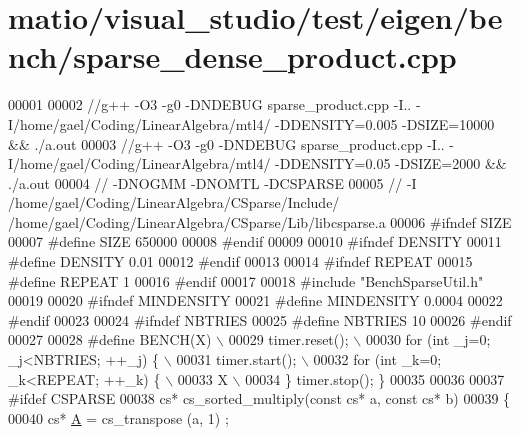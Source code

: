\hypertarget{matio_2visual__studio_2test_2eigen_2bench_2sparse__dense__product_8cpp_source}{}\section{matio/visual\+\_\+studio/test/eigen/bench/sparse\+\_\+dense\+\_\+product.cpp}
\label{matio_2visual__studio_2test_2eigen_2bench_2sparse__dense__product_8cpp_source}

\begin{DoxyCode}
00001 
00002 \textcolor{comment}{//g++ -O3 -g0 -DNDEBUG  sparse\_product.cpp -I.. -I/home/gael/Coding/LinearAlgebra/mtl4/ -DDENSITY=0.005
       -DSIZE=10000 && ./a.out}
00003 \textcolor{comment}{//g++ -O3 -g0 -DNDEBUG  sparse\_product.cpp -I.. -I/home/gael/Coding/LinearAlgebra/mtl4/ -DDENSITY=0.05
       -DSIZE=2000 && ./a.out}
00004 \textcolor{comment}{// -DNOGMM -DNOMTL -DCSPARSE}
00005 \textcolor{comment}{// -I /home/gael/Coding/LinearAlgebra/CSparse/Include/
       /home/gael/Coding/LinearAlgebra/CSparse/Lib/libcsparse.a}
00006 \textcolor{preprocessor}{#ifndef SIZE}
00007 \textcolor{preprocessor}{#define SIZE 650000}
00008 \textcolor{preprocessor}{#endif}
00009 
00010 \textcolor{preprocessor}{#ifndef DENSITY}
00011 \textcolor{preprocessor}{#define DENSITY 0.01}
00012 \textcolor{preprocessor}{#endif}
00013 
00014 \textcolor{preprocessor}{#ifndef REPEAT}
00015 \textcolor{preprocessor}{#define REPEAT 1}
00016 \textcolor{preprocessor}{#endif}
00017 
00018 \textcolor{preprocessor}{#include "BenchSparseUtil.h"}
00019 
00020 \textcolor{preprocessor}{#ifndef MINDENSITY}
00021 \textcolor{preprocessor}{#define MINDENSITY 0.0004}
00022 \textcolor{preprocessor}{#endif}
00023 
00024 \textcolor{preprocessor}{#ifndef NBTRIES}
00025 \textcolor{preprocessor}{#define NBTRIES 10}
00026 \textcolor{preprocessor}{#endif}
00027 
00028 \textcolor{preprocessor}{#define BENCH(X) \(\backslash\)}
00029 \textcolor{preprocessor}{  timer.reset(); \(\backslash\)}
00030 \textcolor{preprocessor}{  for (int \_j=0; \_j<NBTRIES; ++\_j) \{ \(\backslash\)}
00031 \textcolor{preprocessor}{    timer.start(); \(\backslash\)}
00032 \textcolor{preprocessor}{    for (int \_k=0; \_k<REPEAT; ++\_k) \{ \(\backslash\)}
00033 \textcolor{preprocessor}{        X  \(\backslash\)}
00034 \textcolor{preprocessor}{  \} timer.stop(); \}}
00035 
00036 
00037 \textcolor{preprocessor}{#ifdef CSPARSE}
00038 cs* cs\_sorted\_multiply(\textcolor{keyword}{const} cs* a, \textcolor{keyword}{const} cs* b)
00039 \{
00040   cs* \hyperlink{group___core___module_class_eigen_1_1_matrix}{A} = cs\_transpose (a, 1) ;

\end{DoxyCode}
